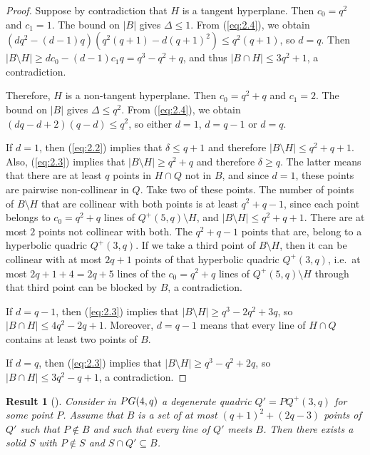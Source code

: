 \documentclass[a4paper]{article}
\newtheorem{res}[thm]{Result}
\theoremstyle{definition}
\newcommand{\PG}{\textnormal{PG}}
\begin{document}
\begin{proof}
Suppose by contradiction that $H$ is a tangent hyperplane. Then $c_0=q^2$ and $c_1=1$. The bound on $|B|$ gives $\Delta\leq 1$. From (\ref{eq:2.4}), we obtain $ \left(dq^2-(d-1)q\right)\left(q^2(q+1)-d(q+1)^2\right)\leq q^2(q+1)$, so $d=q$. Then $|B \setminus  H| \geq dc_0 - (d - 1)c_1 q=q^3-q^2+q$,  and thus $|B\cap H|\leq 3q^2+1$, a contradiction.

Therefore, $H$ is a non-tangent hyperplane. Then $c_0=q^2+q$ and $c_1=2$. The bound on $ |B|$ gives $\Delta\leq q^2$. From (\ref{eq:2.4}), we obtain $\left(dq-d+2\right)\left(q-d\right)\leq q^2$, so either \(d=1\), \(d=q-1\) or \(d=q\).

If $d=1$, then (\ref{eq:2.2}) implies that $\delta\leq q+1$ and therefore $ |B\setminus H|\leq q^2+q+1$. Also, (\ref{eq:2.3}) implies that $ |B\setminus H|\geq q^2+q$ and therefore $\delta\geq q$. The latter means that there are at least $q$ points in $H \cap Q$  not in $B$, and since $d=1$, these points are pairwise non-collinear in $Q$. Take two of these points. The number of points of $B\setminus H$ that are collinear with both points is at least $q^2+q-1$, since each point belongs to $c_0=q^2+q$ lines of $Q^+(5,q)\setminus H$, and $ |B\setminus H|\leq q^2+q+1$. There are at most $2$ points not collinear with both. The $q^2+q-1$ points that are, belong to a hyperbolic quadric $Q^+(3,q)$. If we take a third point of $B\setminus H$, then it can be collinear with at most $2q+1$ points of that hyperbolic quadric $Q^+(3,q)$, i.e.\ at most $2q+1+4=2q+5$ lines of the $c_0=q^2+q$ lines of $Q^+(5,q)\setminus H$ through that third point can be blocked by $B$, a contradiction.

If $d=q-1$, then (\ref{eq:2.3}) implies that $ |B\setminus H|\geq q^3-2q^2+3q$, so $ |B\cap H|\leq 4q^2-2q+1$. Moreover, $d=q-1$ means that every line of $H\cap Q$ contains at least two points of $B$.

If $d=q$, then (\ref{eq:2.3}) implies that $|B\setminus H|\geq q^3-q^2+2q$, so $|B\cap H|\leq 3q^2-q+1$, a contradiction.
\end{proof}


\begin{res}[{\cite[Lemma 2.4]{metsch2000blocking}}]
 \label{lemma:solid}
Consider in $\PG(4,q)$ a degenerate quadric $Q' = P Q^+(3,q)$ for some point $P$.
Assume that $B$ is a set of at most $ (q+1)^2+(2q-3)$ points of $Q'$ such that $P\notin B$ and such that every line of $Q'$ meets $B$. Then there exists a solid $S$ with $P\notin S$ and
$S\cap Q'\subseteq B$. 
\end{res}
\end{document}
